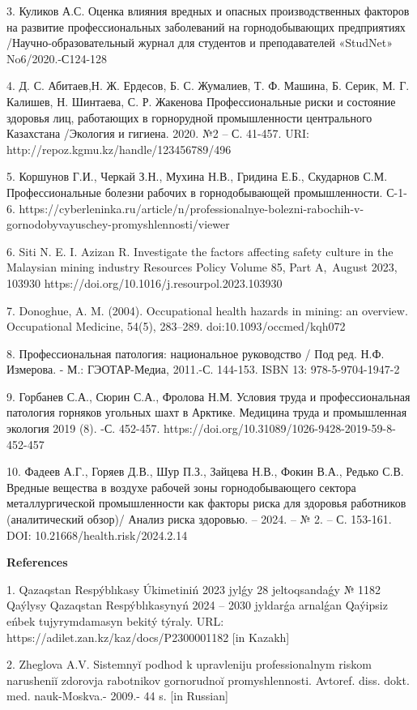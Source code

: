 3. Куликов А.С. Оценка влияния вредных и опасных производственных
факторов на развитие профессиональных заболеваний на горнодобывающих
предприятиях /Научно-образовательный журнал для студентов и
преподавателей «StudNet» No6/2020.-С124-128

4. Д. С. Абитаев,Н. Ж. Ердесов, Б. С. Жумалиев, Т. Ф. Машина, Б. Серик,
М. Г. Калишев, Н. Шинтаева, С. Р. Жакенова Профессиональные риски и
состояние здоровья лиц, работающих в горнорудной промышленности
центрального Казахстана /Экология и гигиена. 2020. №2 -- С. 41-457. URI:
http://repoz.kgmu.kz/handle/123456789/496

5. Коршунов Г.И., Черкай З.Н., Мухина Н.В., Гридина Е.Б., Скударнов С.М.
Профессиональные болезни рабочих в горнодобывающей промышленности.
С-1-6.
https://cyberleninka.ru/article/n/professionalnye-bolezni-rabochih-v-gornodobyvayuschey-promyshlennosti/viewer

6. Siti N. E. I. Azizan R. Investigate the factors affecting safety
culture in the Malaysian mining industry Resources Policy Volume 85,
Part A,~August 2023, 103930
https://doi.org/10.1016/j.resourpol.2023.103930

7. Donoghue, A. M. (2004). Occupational health hazards in mining: an
overview. Occupational Medicine, 54(5), 283--289.
doi:10.1093/occmed/kqh072~

8. Профессиональная патология: национальное руководство / Под ред. Н.Ф.
Измерова. - М.: ГЭОТАР-Медиа, 2011.-С. 144-153. ISBN 13:
978-5-9704-1947-2

9. Горбанев С.А., Сюрин С.А., Фролова Н.М. Условия труда и
профессиональная патология горняков угольных шахт в Арктике. Медицина
труда и промышленная экология 2019 (8). -С. 452-457.
https://doi.org/10.31089/1026-9428-2019-59-8-452-457

10. Фадеев А.Г., Горяев Д.В., Шур П.З., Зайцева Н.В., Фокин В.А., Редько
С.В. Вредные вещества в воздухе рабочей зоны горнодобывающего сектора
металлургической промышленности как факторы риска для здоровья
работников (аналитический обзор)/ Анализ риска здоровью. -- 2024. -- №
2. -- С. 153-161. DOI: 10.21668/health.risk/2024.2.14

{\bfseries References}

1. Qazaqstan Respýblıkasy Úkimetiniń 2023 jylǵy 28 jeltoqsandaǵy № 1182
Qaýlysy Qazaqstan Respýblıkasynyń 2024 -- 2030 jyldarǵa arnalǵan
Qaýipsiz eńbek tujyrymdamasyn bekitý týraly. URL:
https://adilet.zan.kz/kaz/docs/P2300001182 {[}in Kazakh{]}

2. Zheglova A.V. Sistemnyĭ podhod k upravleniju
professional\textquotesingle nym riskom narusheniĭ
zdorov\textquotesingle ja rabotnikov gornorudnoĭ promyshlennosti.
Avtoref. diss. dokt. med. nauk-Moskva.- 2009.- 44 s. {[}in Russian{]}

